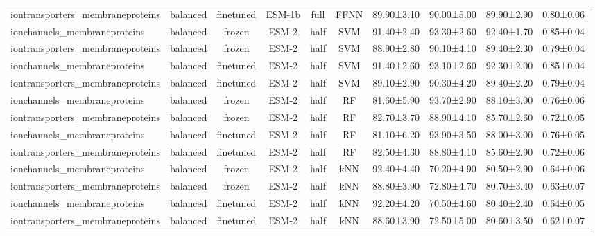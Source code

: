\begin{tabular}{lcccccc}
iontransporters\_membraneproteins &   balanced &      finetuned &       ESM-1b &      full &       FFNN &  89.90±3.10 &  90.00±5.00 &  89.90±2.90 & 0.80±0.06 \\
    ionchannels\_membraneproteins &   balanced &         frozen &        ESM-2 &      half &        SVM &  91.40±2.40 &  93.30±2.60 &  92.40±1.70 & 0.85±0.04 \\
iontransporters\_membraneproteins &   balanced &         frozen &        ESM-2 &      half &        SVM &  88.90±2.80 &  90.10±4.10 &  89.40±2.30 & 0.79±0.04 \\
    ionchannels\_membraneproteins &   balanced &      finetuned &        ESM-2 &      half &        SVM &  91.40±2.60 &  93.10±2.60 &  92.30±2.00 & 0.85±0.04 \\
iontransporters\_membraneproteins &   balanced &      finetuned &        ESM-2 &      half &        SVM &  89.10±2.90 &  90.30±4.20 &  89.40±2.20 & 0.79±0.04 \\
    ionchannels\_membraneproteins &   balanced &         frozen &        ESM-2 &      half &         RF &  81.60±5.90 &  93.70±2.90 &  88.10±3.00 & 0.76±0.06 \\
iontransporters\_membraneproteins &   balanced &         frozen &        ESM-2 &      half &         RF &  82.70±3.70 &  88.90±4.10 &  85.70±2.60 & 0.72±0.05 \\
    ionchannels\_membraneproteins &   balanced &      finetuned &        ESM-2 &      half &         RF &  81.10±6.20 &  93.90±3.50 &  88.00±3.00 & 0.76±0.05 \\
iontransporters\_membraneproteins &   balanced &      finetuned &        ESM-2 &      half &         RF &  82.50±4.30 &  88.80±4.10 &  85.60±2.90 & 0.72±0.06 \\
    ionchannels\_membraneproteins &   balanced &         frozen &        ESM-2 &      half &        kNN &  92.40±4.40 &  70.20±4.90 &  80.50±2.90 & 0.64±0.06 \\
iontransporters\_membraneproteins &   balanced &         frozen &        ESM-2 &      half &        kNN &  88.80±3.90 &  72.80±4.70 &  80.70±3.40 & 0.63±0.07 \\
    ionchannels\_membraneproteins &   balanced &      finetuned &        ESM-2 &      half &        kNN &  92.20±4.20 &  70.50±4.60 &  80.40±2.40 & 0.64±0.05 \\
iontransporters\_membraneproteins &   balanced &      finetuned &        ESM-2 &      half &        kNN &  88.60±3.90 &  72.50±5.00 &  80.60±3.50 & 0.62±0.07 \\

\end{tabular}
